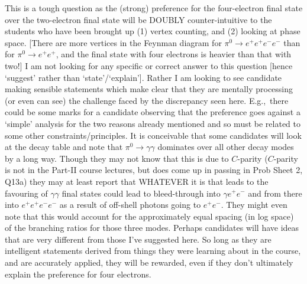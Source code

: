 \documentclass[txfonts]{NSTexam}
\newcommand\ANS[1]{{

\answer %


{\color{blue}
#1
}
 
\endanswer

}}
\begin{document}
\begin{questions}
\begin{allparts}
\ANS{
This is a tough question as the (strong) preference for the four-electron final state over the two-electron final state will be DOUBLY counter-intuitive to the students who have been brought up (1) vertex counting, and (2) looking at phase space.  [There are more vertices in the Feynman diagram for $\pi^0\rightarrow e^+e^+e^-e^-$  than for $\pi^0\rightarrow e^+e^+$, and the final state with four electrons is heavier than that with two!]  I am not looking for any specific or correct answer to this question [hence `suggest' rather than `state'/`explain']. Rather I am looking to see candidate making sensible statements which make clear that they are mentally processing (or even can see) the challenge faced by the discrepancy seen here.     E.g.,~there could be some marks for a candidate observing that the preference goes against a `simple' analysis for the two reasons already mentioned and so must be related to some other constraints/principles.  It is conceivable that some candidates will look at the decay table and note that $\pi^0\rightarrow \gamma\gamma$  dominates over all other decay modes by a long way. Though they may not know that this is due to $C$-parity ($C$-parity is not in the Part-II course lectures, but does come up in passing in Prob Sheet 2, Q13a) they may at least report that WHATEVER it is that leads to the favouring of $\gamma\gamma$ final states could lead to bleed-through into $\gamma e^+e^-$ and from there into $ e^+e^+e^-e^-$ as a result of off-shell photons going to $e^+e^-$. They might even note that this would account for the approximately equal spacing (in log space) of the branching ratios for those three modes. Perhaps candidates will have ideas that are very different from those I've suggested here. So long as they are intelligent statements derived from things they were learning about in the course, and are accurately applied, they will be rewarded, even if they don't ultimately explain the preference for four electrons. 

}
\end{allparts}
\end{questions}
\end{document}

